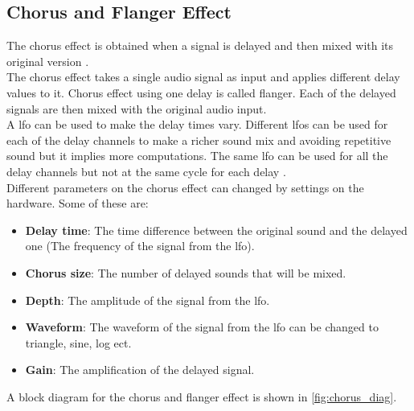 \subsection{Chorus and Flanger Effect}

The chorus effect is obtained when a signal is delayed and then mixed with its original version \citep{chorus_gibson} \citep{chorus_apple}. \\
The chorus effect takes a single audio signal as input and applies different delay values to it. Chorus effect using one delay is called flanger. Each of the delayed signals are then mixed with the original audio input. \\
A \gls{lfo} can be used to make the delay times vary. Different \gls{lfo}s can be used for each of the delay channels to make a richer sound mix and avoiding repetitive sound but it implies more computations. The same \gls{lfo} can be used for all the delay channels but not at the same cycle for each delay \citep{chorus_testtone}. \\ 

Different parameters on the chorus effect can changed by settings on the hardware. Some of these are:\\
\begin{itemize}
\item \textbf{Delay time}: The time difference between the original sound and the delayed one (The frequency of the signal from the \gls{lfo}).
\item \textbf{Chorus size}: The number of delayed sounds that will be mixed.
\item \textbf{Depth}: The amplitude of the signal from the \gls{lfo}.
\item \textbf{Waveform}: The waveform of the signal from the \gls{lfo} can be changed to triangle, sine, log ect. \citep{hobby_hour_chorus}
\item \textbf{Gain}: The amplification of the delayed signal.
\end{itemize} \citep{chorus_parameters}

A block diagram for  the chorus and flanger effect is shown in \autoref{fig:chorus_diag}.

